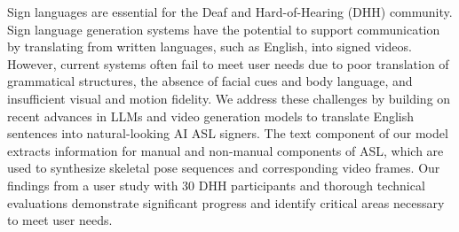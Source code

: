 
Sign languages are essential for the Deaf and Hard-of-Hearing (DHH) community. Sign language generation systems have the potential to support communication by translating from written languages, such as English, into signed videos. However, current systems often fail to meet user needs due to poor translation of grammatical structures, the absence of facial cues and body language, and insufficient visual and motion fidelity. 
We address these challenges by building on recent advances in LLMs and video generation models to translate English sentences into natural-looking AI ASL signers.
The text component of our model extracts information for manual and non-manual components of ASL, which are used to synthesize skeletal pose sequences and corresponding video frames. 
Our findings from a user study with 30 DHH participants and thorough technical evaluations demonstrate significant progress and identify critical areas necessary to meet user needs. 
